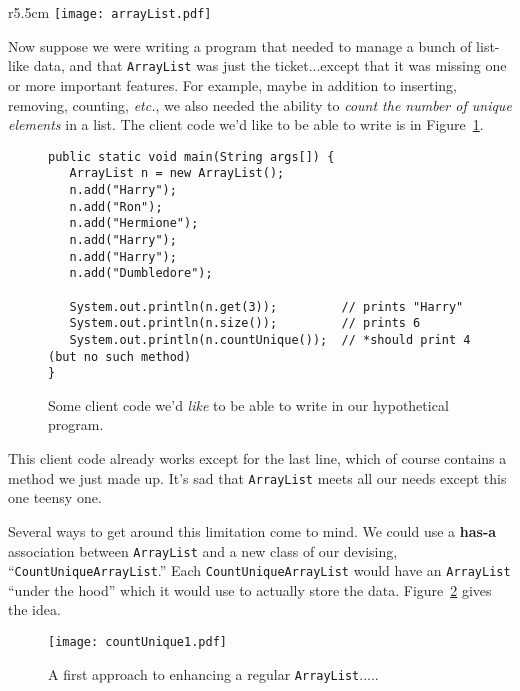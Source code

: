 \begin{wrapfigure}{r}{5.5cm}
\vspace{-.2in}
\texttt{[image: arrayList.pdf]}
\caption{An abbreviated \texttt{ArrayList} class.}
\label{fig:abbrArrayList}
\end{wrapfigure}

Now suppose we were writing a program that needed to manage a bunch of
list-like data, and that \texttt{ArrayList} was just the ticket...except that
it was missing one or more important features. For example, maybe in addition
to inserting, removing, counting, \textit{etc.}, we also needed the ability to
\textit{count the number of unique elements} in a list. The client code we'd
like to be able to write is in Figure~\ref{fig:dreamCountUnique}.

\begin{figure}[hb]
\centering
\begin{Verbatim}[fontsize=\footnotesize,samepage=true,frame=single]
public static void main(String args[]) {
   ArrayList n = new ArrayList();
   n.add("Harry");
   n.add("Ron");
   n.add("Hermione");
   n.add("Harry");
   n.add("Harry");
   n.add("Dumbledore");
 
   System.out.println(n.get(3));         // prints "Harry"
   System.out.println(n.size());         // prints 6
   System.out.println(n.countUnique());  // *should print 4 (but no such method)
}
\end{Verbatim}
\caption{Some client code we'd \textit{like} to be able to write in our
hypothetical program.}
\label{fig:dreamCountUnique}
\end{figure}

This client code already works except for the last line, which of course
contains a method we just made up. It's sad that \texttt{ArrayList} meets all
our needs except this one teensy one.

Several ways to get around this limitation come to mind. We could use a
\textbf{has-a} association between \texttt{ArrayList} and a new class of our
devising, ``\texttt{CountUniqueArrayList}.'' Each \texttt{CountUniqueArrayList}
would have an \texttt{ArrayList} ``under the hood'' which it would use to
actually store the data. Figure~\ref{fig:countUnique1} gives the idea.

\begin{figure}
\centering
\texttt{[image: countUnique1.pdf]}  %
\caption{A first approach to enhancing a regular \texttt{ArrayList}.....}
\label{fig:countUnique1}
\end{figure}

